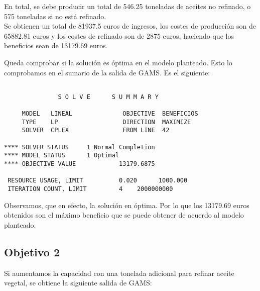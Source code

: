 \documentclass[12pt,a4paper,twoside,openright,titlepage,final]{article}
\begin{document}
En total, se debe producir un total de 546.25 toneladas de aceites no refinado, o 575 toneladas si no está refinado.\\

Se obtienen un total de 81937.5 euros de ingresos, los costes de producción son de 65882.81 euros y los costes de refinado son de 2875 euros, haciendo que los beneficios sean de 13179.69 euros.

Queda comprobar si la solución es óptima en el modelo planteado. Esto lo comprobamos en el sumario de la salida de GAMS. Es el siguiente:

\begin{verbatim}

               S O L V E      S U M M A R Y

     MODEL   LINEAL              OBJECTIVE  BENEFICIOS
     TYPE    LP                  DIRECTION  MAXIMIZE
     SOLVER  CPLEX               FROM LINE  42

**** SOLVER STATUS     1 Normal Completion         
**** MODEL STATUS      1 Optimal                   
**** OBJECTIVE VALUE            13179.6875

 RESOURCE USAGE, LIMIT          0.020      1000.000
 ITERATION COUNT, LIMIT         4    2000000000

\end{verbatim}

Observamos, que en efecto, la solución en óptima. Por lo que los 13179.69 euros obtenidos son el máximo beneficio que se puede obtener de acuerdo al modelo planteado.

\subsection{Objetivo 2}

Si aumentamos la capacidad con una tonelada adicional para refinar aceite vegetal, se obtiene la siguiente salida de GAMS:
\end{document}
